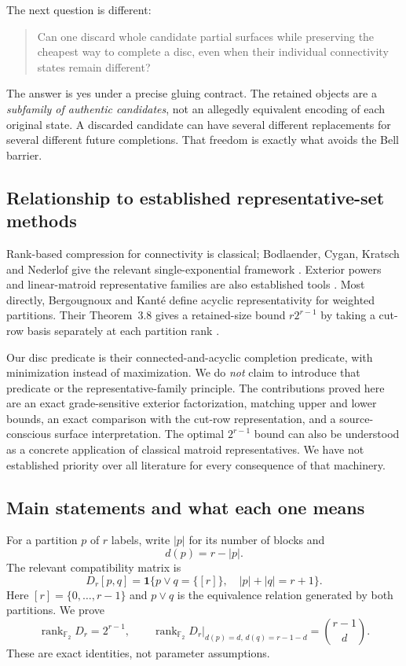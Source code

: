 \documentclass[11pt,a4paper]{article}
\theoremstyle{remark}\newtheorem{remark}[theorem]{Remark}
\newcommand{\F}{\mathbb F_2}
\newcommand{\rank}{\operatorname{rank}}
\newcommand{\one}{\mathbf 1}
\newcommand{\pjoin}{\vee}
\begin{document}
The next question is different:
\begin{quote}
Can one discard whole candidate partial surfaces while preserving the cheapest way to complete a disc, even when their individual connectivity states remain different?
\end{quote}
The answer is yes under a precise gluing contract. The retained objects are a \emph{subfamily of authentic candidates}, not an allegedly equivalent encoding of each original state. A discarded candidate can have several different replacements for several different future completions. That freedom is exactly what avoids the Bell barrier.

\subsection{Relationship to established representative-set methods}
Rank-based compression for connectivity is classical; Bodlaender, Cygan, Kratsch and Nederlof give the relevant single-exponential framework \cite{bckn}. Exterior powers and linear-matroid representative families are also established tools \cite{flps}. Most directly, Bergougnoux and Kant\'e define acyclic representativity for weighted partitions. Their Theorem~3.8 gives a retained-size bound $r2^{r-1}$ by taking a cut-row basis separately at each partition rank \cite{bk}.

Our disc predicate is their connected-and-acyclic completion predicate, with minimization instead of maximization. We do \emph{not} claim to introduce that predicate or the representative-family principle. The contributions proved here are an exact grade-sensitive exterior factorization, matching upper and lower bounds, an exact comparison with the cut-row representation, and a source-conscious surface interpretation. The optimal $2^{r-1}$ bound can also be understood as a concrete application of classical matroid representatives. We have not established priority over all literature for every consequence of that machinery.

\subsection{Main statements and what each one means}
For a partition $p$ of $r$ labels, write $|p|$ for its number of blocks and
\[
 d(p)=r-|p|.
\]
The relevant compatibility matrix is
\begin{equation}\label{eq:D}
 D_r[p,q]=\one\{p\pjoin q=\{[r]\},\quad |p|+|q|=r+1\}.
\end{equation}
Here $[r]=\{0,\ldots,r-1\}$ and $p\pjoin q$ is the equivalence relation generated by both partitions. We prove
\begin{equation}\label{eq:mainrank}
 \rank_{\F}D_r=2^{r-1},\qquad
 \rank_{\F}D_r\big|_{d(p)=d,\,d(q)=r-1-d}=\binom{r-1}{d}.
\end{equation}
These are exact identities, not parameter assumptions.
\end{document}

